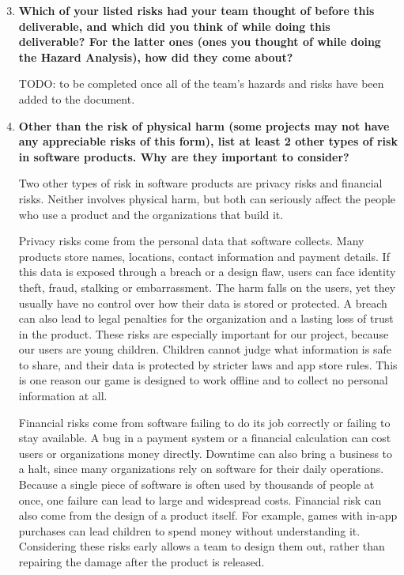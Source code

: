 \documentclass{article}
\newcounter{hazard}
\newcounter{sr}
\begin{document}
\begin{enumerate}
    \setcounter{enumi}{2}

    \item \textbf{Which of your listed risks had your team thought of before
    this deliverable, and which did you think of while doing this deliverable? For
    the latter ones (ones you thought of while doing the Hazard Analysis), how did
    they come about?}

    TODO: to be completed once all of the team's hazards and risks have been
    added to the document.

    \item \textbf{Other than the risk of physical harm (some projects may not
    have any appreciable risks of this form), list at least 2 other types of risk
    in software products. Why are they important to consider?}

    Two other types of risk in software products are privacy risks and financial
    risks. Neither involves physical harm, but both can seriously affect the people
    who use a product and the organizations that build it.

    Privacy risks come from the personal data that software collects. Many
    products store names, locations, contact information and payment details. If
    this data is exposed through a breach or a design flaw, users can face
    identity theft, fraud, stalking or embarrassment. The harm falls on the users,
    yet they usually have no control over how their data is stored or protected.
    A breach can also lead to legal penalties for the organization and a lasting
    loss of trust in the product. These risks are especially important for our
    project, because our users are young children. Children cannot judge what
    information is safe to share, and their data is protected by stricter laws and
    app store rules. This is one reason our game is designed to work offline and
    to collect no personal information at all.

    Financial risks come from software failing to do its job correctly or failing
    to stay available. A bug in a payment system or a financial calculation can
    cost users or organizations money directly. Downtime can also bring a business
    to a halt, since many organizations rely on software for their daily
    operations. Because a single piece of software is often used by thousands of
    people at once, one failure can lead to large and widespread costs. Financial
    risk can also come from the design of a product itself. For example, games
    with in-app purchases can lead children to spend money without understanding
    it. Considering these risks early allows a team to design them out, rather
    than repairing the damage after the product is released.
\end{enumerate}

\newpage



\end{document}
